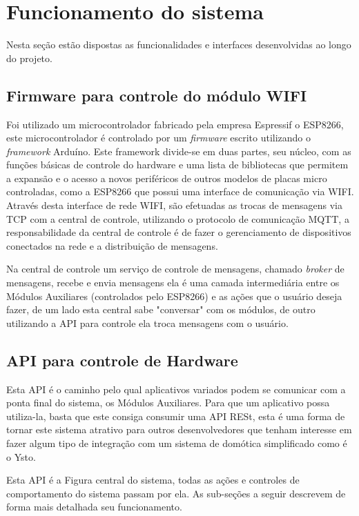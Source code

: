 \chapter{Funcionamento do sistema}

Nesta seção estão dispostas as funcionalidades e interfaces desenvolvidas ao longo do projeto.

\section{Firmware para controle do módulo WIFI}

Foi utilizado um microcontrolador fabricado pela empresa Espressif o ESP8266, este microcontrolador é controlado por um \textit{firmware} escrito utilizando o \textit{framework} Arduíno. Este framework divide-se em duas partes, seu núcleo, com as funções básicas de controle do hardware e uma lista de bibliotecas que permitem a expansão e o acesso a novos periféricos de outros modelos de placas micro controladas, como a ESP8266 que possui uma interface de comunicação via WIFI. Através desta interface de rede WIFI, são efetuadas as trocas de mensagens via TCP com a central de controle, utilizando o protocolo de comunicação MQTT, a responsabilidade da central de controle é de fazer o gerenciamento de dispositivos conectados na rede e a distribuição de mensagens.

Na central de controle um serviço de controle de mensagens, chamado \textit{broker} de mensagens, recebe e envia mensagens ela é uma camada intermediária entre os Módulos Auxiliares (controlados pelo ESP8266) e as ações que o usuário deseja fazer, de um lado esta central sabe "conversar" com os módulos, de outro utilizando a API para controle ela troca mensagens com o usuário.

\section{API para controle de Hardware}

Esta API é o caminho pelo qual aplicativos variados podem se comunicar com a ponta final do sistema, os Módulos Auxiliares. Para que um aplicativo possa utiliza-la, basta que este consiga consumir uma API RESt, esta é uma forma de tornar este sistema atrativo para outros desenvolvedores que tenham interesse em fazer algum tipo de integração com um sistema de domótica simplificado como é o Ysto.

Esta API é a Figura central do sistema, todas as ações e controles de comportamento do sistema passam por ela. As sub-seções a seguir descrevem de forma mais detalhada seu funcionamento.

